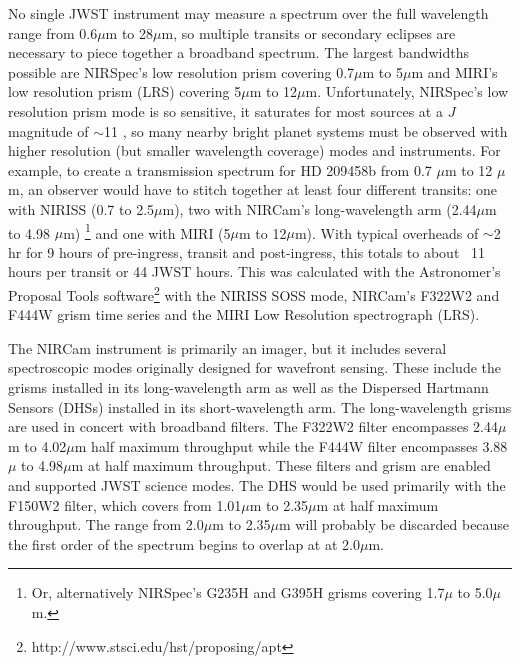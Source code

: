 \documentclass{emulateapj}
\begin{document}
No single JWST instrument may measure a spectrum over the full wavelength range from 0.6$\mu$m to 28$\mu$m, so multiple transits or secondary eclipses are necessary to piece together a broadband spectrum. The largest bandwidths possible are NIRSpec's low resolution prism covering 0.7$\mu$m to 5$\mu$m and MIRI's low resolution prism (LRS) covering 5$\mu$m to 12$\mu$m. Unfortunately, NIRSpec's low resolution prism mode is so sensitive, it saturates for most sources at a $J$ magnitude of $\sim$11 \citep{beichman2014pasp}, so many nearby bright planet systems must be observed with higher resolution (but smaller wavelength coverage) modes and instruments. For example, to create a transmission spectrum for HD 209458b \citep{henry00,charbonneau00} from 0.7 $\mu$m to 12 $\mu$m, an observer would have to stitch together at least four different transits: one with NIRISS (0.7 to 2.5$\mu$m), two with NIRCam's long-wavelength arm (2.44$\mu$m to 4.98 $\mu$m) \footnote{Or, alternatively NIRSpec's G235H and G395H  grisms covering 1.7$\mu$ to 5.0$\mu$m.} and one with MIRI (5$\mu$m to 12$\mu$m). With typical overheads of $\sim$2 hr for 9 hours of pre-ingress, transit and post-ingress, this totals to about ~11 hours per transit or 44 JWST hours. This was calculated with the Astronomer's Proposal Tools software\footnote{http://www.stsci.edu/hst/proposing/apt} with the NIRISS SOSS mode, NIRCam's F322W2 and F444W grism time series and the MIRI Low Resolution spectrograph (LRS).

The NIRCam instrument is primarily an imager, but it includes several spectroscopic modes originally designed for wavefront sensing. These include the grisms installed in its long-wavelength arm as well as the Dispersed Hartmann Sensors (DHSs) installed in its short-wavelength arm. The long-wavelength grisms are used in concert with broadband filters. The F322W2 filter encompasses 2.44$\mu$m to 4.02$\mu$m half maximum throughput while the F444W filter encompasses 3.88$\mu$ to 4.98$\mu$m at half maximum throughput. These filters and grism are enabled and supported JWST science modes. The DHS would be used primarily with the F150W2 filter, which covers from 1.01$\mu$m to 2.35$\mu$m at half maximum throughput. The range from 2.0$\mu$m to 2.35$\mu$m will probably be discarded because the first order of the spectrum begins to overlap at at 2.0$\mu$m.
\end{document}
